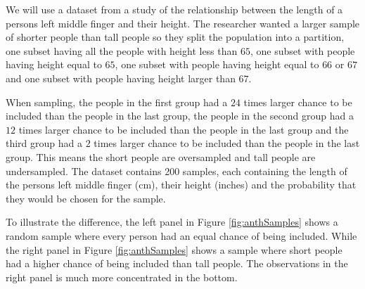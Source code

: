 \documentclass{article}
\begin{document}
\begin{example}

We will use a dataset from a study of the relationship between the length of a persons left middle finger and their height. 
The researcher wanted a larger sample of shorter people than tall people so they
split the population into a partition, one subset having all the people with
height less than \(65\), one subset with people having height equal to \(65\), one subset
with people having height equal to \(66\) or \(67\) and one subset with people
having height larger than \(67\).

When sampling, the people in the first group had a \(24\) times larger chance to
be included than the people in the last group, the people in the second group
had a \(12\) times larger chance to be included than the people in the last
group and the third group had a \(2\) times larger chance to be included than
the people in the last group.
This means the short people are oversampled and tall people are undersampled.
The dataset contains 200 samples, each containing the length of the persons left middle finger (cm), their height (inches) and the probability that they would be chosen for the sample.

To illustrate the difference, the left panel in Figure \ref{fig:anthSamples} shows a random sample where every
person had an equal chance of being included. While the right panel in Figure \ref{fig:anthSamples} shows a sample
where short people had a higher chance of being included than tall people. The
observations in the right panel is much more concentrated in the bottom.


\end{example}
\end{document}
